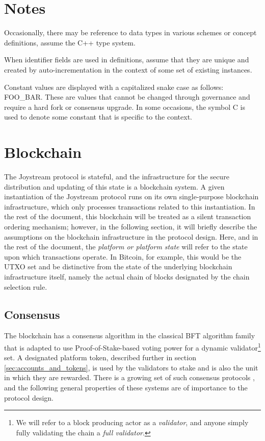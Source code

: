 \documentclass{article}
\begin{document}
\section{Notes}

Occasionally, there may be reference to data types in various schemes or concept definitions, assume the C++ type system.

When identifier fields are used in definitions, assume that they are unique and created by auto-incrementation in the context of some set of existing instances.

Constant values are displayed with a capitalized snake case as follows: {\tiny FOO\_BAR}. These are values that cannot be changed through governance and require a hard fork or consensus upgrade. In some occasions, the symbol {\tiny C} is used to denote some constant that is specific to the context.

\section{Blockchain}

The Joystream protocol is stateful, and the infrastructure for the secure distribution and updating of this state is a blockchain system.
A given instantiation of the Joystream protocol runs on its own single-purpose blockchain infrastructure, which only processes transactions related to this instantiation. In the rest of the document, this blockchain will be treated as a silent transaction ordering mechanism; however, in the following section, it will briefly describe the assumptions on the blockchain infrastructure in the protocol design. Here, and in the rest of the document, the \textit{platform or platform state} will refer to the state upon which transactions operate. In Bitcoin, for example, this would be the UTXO set and be distinctive from the state of the underlying blockchain infrastructure itself, namely the actual chain of blocks designated by the chain selection rule.

\subsection{Consensus}

The blockchain has a consensus algorithm in the classical BFT algorithm family that is adapted to use Proof-of-Stake-based voting power for a dynamic validator\footnote{We will refer to a block producing actor as a \textit{validator}, and anyone simply fully validating the chain a \textit{full validator}.} set. A designated platform token, described further in section \ref{sec:accounts_and_tokens}, is used by the validators to stake and is also the unit in which they are rewarded. There is a growing set of such consensus protocols \cite{tendermint, kiayias2017ouroboros, algorand}, and the following general properties of these systems are of importance to the protocol design.
\end{document}
